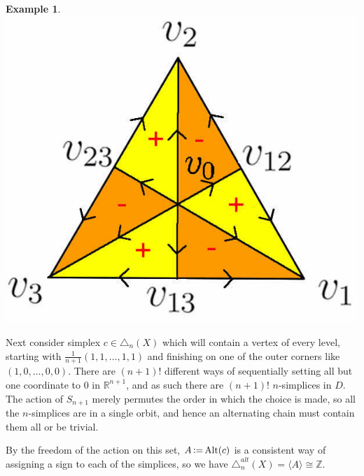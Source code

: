 \documentclass[11pt,a4paper,twoside]{article}
\theoremstyle{plain}
\theoremstyle{definition}
\theoremstyle{definition}
\theoremstyle{definition}
\theoremstyle{definition}
\newtheorem{example}[thm]{Example}
\theoremstyle{definition}
\DeclareMathOperator{\Alt}{Alt}
\DeclareMathOperator{\coloneqq}{\vcentcolon=}
\begin{document}
\begin{example}
\begin{minipage}{.3\textwidth}
\includegraphics[scale=0.2]{Images/BarySub2SimplexSign.jpg}
\end{minipage}
\begin{minipage}{.70\textwidth}

Next consider simplex $c\in\triangle_n(X)$ which will contain a vertex of every level, starting with $\frac1{n+1}(1,1,\dots,1,1)$ and finishing on one of the outer corners like $(1,0,\dots,0,0)$. There are $(n\!+\!1)!$ different ways of sequentially setting all but one coordinate to $0$ in $\mathbb{R}^{n+1}$, and as such there are $(n\!+\!1)!$ $n$-simplices in $D$. The action of $S_{n+1}$ merely permutes the order in which the choice is made, so all the $n$-simplices are in a single orbit, and hence an alternating chain must contain them all or be trivial.
\end{minipage}
By the freedom of the action on this set, $A\coloneqq\Alt(c)$ is a consistent way of assigning a sign to each of the simplices, so we have $\triangle_n^{alt}(X)=\langle A\rangle\cong\mathbb{Z}$.
 

\end{example}
\end{document}
